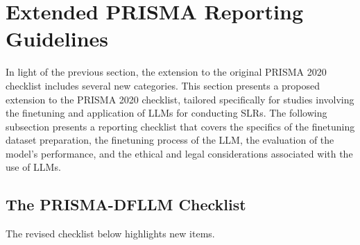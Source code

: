 \documentclass{article}
\begin{document}
\section{Extended PRISMA Reporting Guidelines}


In light of the previous section, the extension to the original PRISMA 2020 checklist includes several new categories. This section presents a proposed extension to the PRISMA 2020 checklist, tailored specifically for studies involving the finetuning and application of LLMs for conducting SLRs. The following subsection presents a reporting checklist that covers the specifics of the finetuning dataset preparation, the finetuning process of the LLM, the evaluation of the model's performance, and the ethical and legal considerations associated with the use of LLMs. 


\subsection{The PRISMA-DFLLM Checklist}


The revised checklist below highlights new items.
\end{document}
